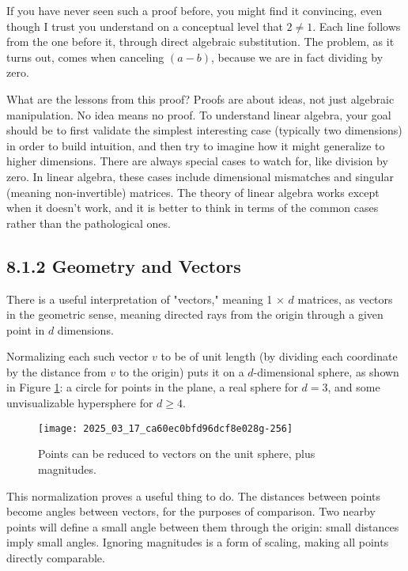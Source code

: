 \documentclass[10pt]{article}
\begin{document}
If you have never seen such a proof before, you might find it convincing, even though I trust you understand on a conceptual level that $2 \neq 1$. Each line follows from the one before it, through direct algebraic substitution. The problem, as it turns out, comes when canceling $(a-b)$, because we are in fact dividing by zero.

What are the lessons from this proof? Proofs are about ideas, not just algebraic manipulation. No idea means no proof. To understand linear algebra, your goal should be to first validate the simplest interesting case (typically two dimensions) in order to build intuition, and then try to imagine how it might generalize to higher dimensions. There are always special cases to watch for, like division by zero. In linear algebra, these cases include dimensional mismatches and singular (meaning non-invertible) matrices. The theory of linear algebra works except when it doesn't work, and it is better to think in terms of the common cases rather than the pathological ones.

\subsection*{8.1.2 Geometry and Vectors}
There is a useful interpretation of "vectors," meaning 1 × $d$ matrices, as vectors in the geometric sense, meaning directed rays from the origin through a given point in $d$ dimensions.

Normalizing each such vector $v$ to be of unit length (by dividing each coordinate by the distance from $v$ to the origin) puts it on a $d$-dimensional sphere, as shown in Figure \ref{fig:unit_sphere}: a circle for points in the plane, a real sphere for $d=3$, and some unvisualizable hypersphere for $d \geq 4$.

\begin{figure}[ht]
    \centering
    \texttt{[image: 2025\_03\_17\_ca60ec0bfd96dcf8e028g-256]}
    \caption{Points can be reduced to vectors on the unit sphere, plus magnitudes.}
    \label{fig:unit_sphere}
\end{figure}

This normalization proves a useful thing to do. The distances between points become angles between vectors, for the purposes of comparison. Two nearby points will define a small angle between them through the origin: small distances imply small angles. Ignoring magnitudes is a form of scaling, making all points directly comparable.
\end{document}
